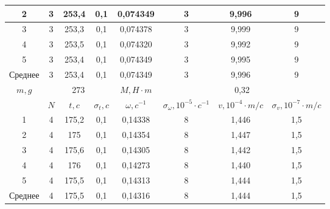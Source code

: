 \documentclass[a4paper, 12pt]{article}%
\begin{document}
\begin{enumerate}
\begin{center}
\begin{tabular}{|c|c|c|c|c|c|c|c|}
2       & 3   & 253,4  & 0,1           & 0,074349         & 3                                       & 9,996                  & 9                             \\ \hline
3       & 3   & 253,3  & 0,1           & 0,074378         & 3                                       & 9,999                  & 9                             \\ \hline
4       & 3   & 253,5  & 0,1           & 0,074320         & 3                                       & 9,992                  & 9                             \\ \hline
5       & 3   & 253,4  & 0,1           & 0,074349         & 3                                       & 9,995                  & 9                             \\ \hline
Среднее & 3   & 253,4  & 0,1           & 0,074349         & 3                                       & 9,996                  & 9                             \\ \hline
\hline
$m, g$  & \multicolumn{3}{c|}{273}     & $M, H \cdot m$   & \multicolumn{3}{c|}{0,32}                                                                        \\ \hline
        & $N$ & $t, c$ & $\sigma_t, c$ & $\omega, c^{-1}$ & $\sigma_{\omega}, 10^{-5} \cdot c^{-1}$ & $v, 10^{-4} \cdot m/c$ & $\sigma_v, 10^{-7} \cdot m/c$ \\ \hline
1       & 4   & 175,2  & 0,1           & 0,14338          & 8                                       & 1,446                  & 1,5                           \\ \hline
2       & 4   & 175    & 0,1           & 0,14354          & 8                                       & 1,447                  & 1,5                           \\ \hline
3       & 4   & 175,6  & 0,1           & 0,14305          & 8                                       & 1,442                  & 1,5                           \\ \hline
4       & 4   & 176    & 0,1           & 0,14273          & 8                                       & 1,440                  & 1,5                           \\ \hline
5       & 4   & 175,5  & 0,1           & 0,14313          & 8                                       & 1,444                  & 1,5                           \\ \hline
Среднее & 4   & 175,5 & 0,1           & 0,14316          & 8                                       & 1,444                  & 1,5                           \\ \hline


\end{tabular}
\end{center}
\end{enumerate}
\end{document}
